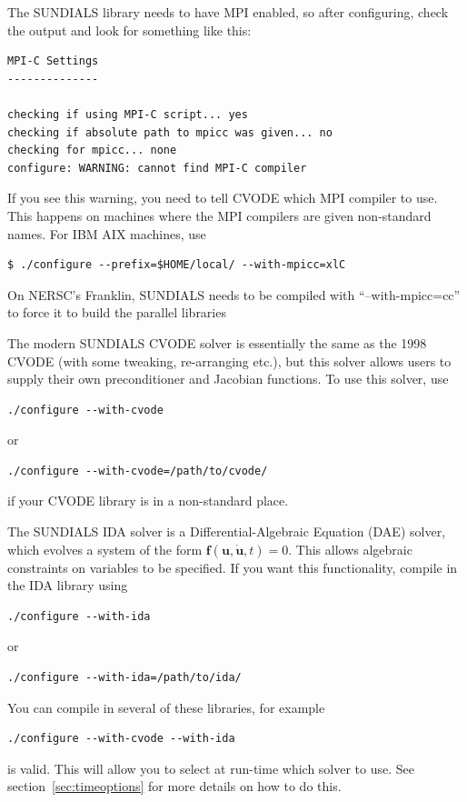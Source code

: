 \documentclass[12pt]{article}
\begin{document}
The SUNDIALS library needs to have MPI enabled, so after configuring, check the output and look for something like this:
\begin{verbatim}
MPI-C Settings
--------------

checking if using MPI-C script... yes
checking if absolute path to mpicc was given... no
checking for mpicc... none
configure: WARNING: cannot find MPI-C compiler
\end{verbatim}

If you see this warning, you need to tell CVODE which MPI compiler to use.
This happens on machines where the MPI compilers are given non-standard
names. For IBM AIX machines, use
\begin{verbatim}
$ ./configure --prefix=$HOME/local/ --with-mpicc=xlC
\end{verbatim}
On NERSC's Franklin, SUNDIALS needs to be compiled with ``--with-mpicc=cc'' to
force it to build the parallel libraries

The modern SUNDIALS CVODE solver is essentially the same as the 1998 CVODE (with some tweaking,
re-arranging etc.), but this solver allows users to supply their own preconditioner
and Jacobian functions. To use this solver, use
\begin{verbatim}
./configure --with-cvode
\end{verbatim}
or
\begin{verbatim}
./configure --with-cvode=/path/to/cvode/
\end{verbatim}
if your CVODE library is in a non-standard place.

The SUNDIALS IDA solver is a Differential-Algebraic Equation (DAE) solver, which evolves a system of the form
$\mathbf{f}\left(\mathbf{u}, \dot{\mathbf{u}}, t\right) = 0$. This allows 
algebraic constraints on variables
to be specified. If you want this functionality, compile in the IDA library using
\begin{verbatim}
./configure --with-ida
\end{verbatim}
or
\begin{verbatim}
./configure --with-ida=/path/to/ida/
\end{verbatim}

You can compile in several of these libraries, for example
\begin{verbatim}
./configure --with-cvode --with-ida
\end{verbatim}
is valid. This will allow you to select at run-time which solver to use. See section~\ref{sec:timeoptions}
for more details on how to do this.
\end{document}
